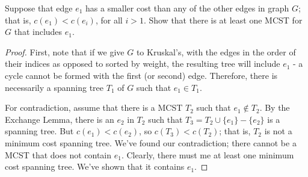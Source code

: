 \documentclass{article}
\newenvironment{prb}[1]
	{\renewcommand\theinner{#1}\inner}
	{\endinner}
\begin{document}
\begin{prb}{2.13}
Suppose that edge $e_1$ has a smaller cost than any of the other
edges in graph $G$; that is, $c(e_1)<c(e_i)$, for all $i>1$. Show
that there is at least one MCST for $G$ that includes $e_1$. 
\end{prb}

\begin{proof}
First, note that if we give $G$ to Kruskal's, with the edges in
the order of their indices as opposed to sorted by weight, the 
resulting tree will include $e_1$ - a cycle cannot be formed with
the first (or second) edge. Therefore, there is necessarily a 
spanning tree $T_1$ of $G$ such that $e_1\in T_1$.

For contradiction, assume that there is a MCST $T_2$ such that
$e_1\notin T_2$. By the Exchange Lemma, there is an $e_2$ in $T_2$
such that $T_3=T_2\cup\{e_1\}-\{e_2\}$ is a spanning tree. But 
$c(e_1)<c(e_2)$, so $c(T_3)<c(T_2)$; that is, $T_2$ is not a minimum
cost spanning tree. We've found our contradiction; there cannot be a 
MCST that does not contain $e_1$. Clearly, there must me at least one
minimum cost spanning tree. We've shown that it contains $e_1$.
\end{proof}
\end{document}
